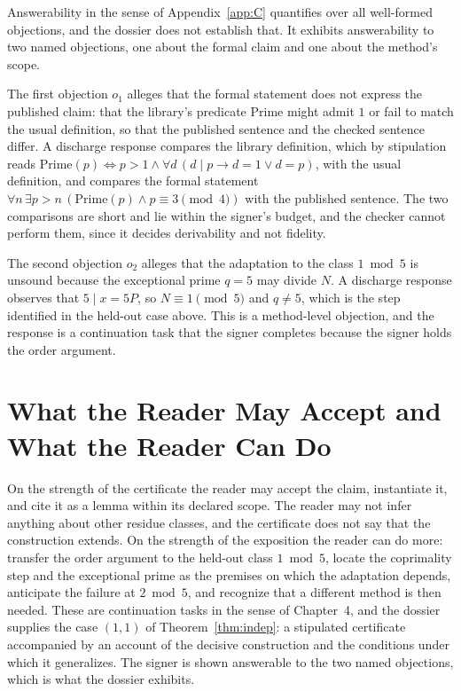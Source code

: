 \documentclass[11pt]{book}
\theoremstyle{definition}
\theoremstyle{remark}
\begin{document}
Answerability in the sense of Appendix~\ref{app:C} quantifies over all well-formed objections, and the dossier does not establish that. It exhibits answerability to two named objections, one about the formal claim and one about the method's scope.

The first objection $o_1$ alleges that the formal statement does not express the published claim: that the library's predicate $\mathrm{Prime}$ might admit $1$ or fail to match the usual definition, so that the published sentence and the checked sentence differ. A discharge response compares the library definition, which by stipulation reads $\mathrm{Prime}(p)\iff p>1\land\forall d\,(d\mid p\to d=1\lor d=p)$, with the usual definition, and compares the formal statement $\forall n\,\exists p>n\,(\mathrm{Prime}(p)\land p\equiv3\pmod4)$ with the published sentence. The two comparisons are short and lie within the signer's budget, and the checker cannot perform them, since it decides derivability and not fidelity.

The second objection $o_2$ alleges that the adaptation to the class $1\bmod5$ is unsound because the exceptional prime $q=5$ may divide $N$. A discharge response observes that $5\mid x=5P$, so $N\equiv1\pmod5$ and $q\ne5$, which is the step identified in the held-out case above. This is a method-level objection, and the response is a continuation task that the signer completes because the signer holds the order argument.

\section{What the Reader May Accept and What the Reader Can Do}

On the strength of the certificate the reader may accept the claim, instantiate it, and cite it as a lemma within its declared scope. The reader may not infer anything about other residue classes, and the certificate does not say that the construction extends. On the strength of the exposition the reader can do more: transfer the order argument to the held-out class $1\bmod5$, locate the coprimality step and the exceptional prime as the premises on which the adaptation depends, anticipate the failure at $2\bmod5$, and recognize that a different method is then needed. These are continuation tasks in the sense of Chapter~4, and the dossier supplies the case $(1,1)$ of Theorem~\ref{thm:indep}: a stipulated certificate accompanied by an account of the decisive construction and the conditions under which it generalizes. The signer is shown answerable to the two named objections, which is what the dossier exhibits.
\end{document}
